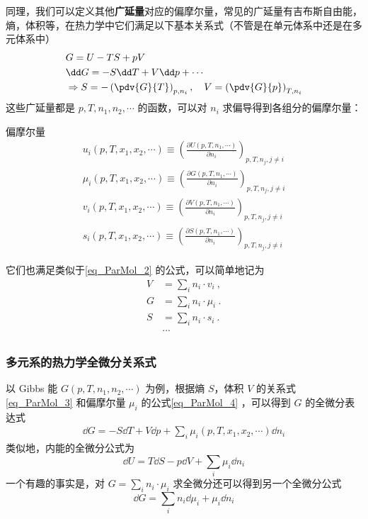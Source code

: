 同理，我们可以定义其他\textbf{广延量}对应的偏摩尔量，常见的广延量有吉布斯自由能，熵，体积等，在热力学中它们满足以下基本关系式（不管是在单元体系中还是在多元体系中）
\begin{equation}\label{eq_ParMol_3}
\begin{aligned}
&G=U-TS+pV\\
&\dd G=-S\dd T+V\dd p+\cdots\\
&\Rightarrow S=-\left(\pdv{G}{T}\right)_{p,n_i},\quad V=\left(\pdv{G}{p}\right)_{T,n_i}
\end{aligned}
\end{equation}
这些广延量都是 $p,T,n_1,n_2,\cdots$ 的函数，可以对 $n_i$ 求偏导得到各组分的偏摩尔量：
\begin{definition}{偏摩尔量}
\begin{equation}\label{eq_ParMol_4}
\begin{aligned}
u_i(p,T,x_1,x_2,\cdots )\equiv \left(\frac{\partial U(p,T,n_1,\cdots)}{\partial n_i}\right)_{p,T,n_j,j\neq i}\\
\mu_i(p,T,x_1,x_2,\cdots )\equiv \left(\frac{\partial G(p,T,n_1,\cdots)}{\partial n_i}\right)_{p,T,n_j,j\neq i}\\
v_i(p,T,x_1,x_2,\cdots )\equiv \left(\frac{\partial V(p,T,n_1,\cdots)}{\partial n_i}\right)_{p,T,n_j,j\neq i}\\
s_i(p,T,x_1,x_2,\cdots )\equiv \left(\frac{\partial S(p,T,n_1,\cdots)}{\partial n_i}\right)_{p,T,n_j,j\neq i}
\end{aligned}
\end{equation}
\end{definition}
它们也满足类似于\autoref{eq_ParMol_2} 的公式，可以简单地记为
\begin{equation}
\begin{aligned}
V &= \sum_i  n_i \cdot v_i ~,\\
G &= \sum_i  n_i \cdot \mu_i~.\\
S &= \sum_i  n_i \cdot s_i~.\\
&...\\
\end{aligned}
\end{equation}
\subsubsection{多元系的热力学全微分关系式}
以 Gibbs 能 $G(p,T,n_1,n_2,\cdots)$ 为例，根据熵 $S$，体积 $V$ 的关系式\autoref{eq_ParMol_3} 和偏摩尔量 $\mu_i$ 的公式\autoref{eq_ParMol_4} ，可以得到 $G$ 的全微分表达式
\begin{equation}
\begin{aligned}
\dd G=-S\dd T+V\dd p+\sum_i \mu_i(p,T,x_1,x_2,\cdots) \dd n_i
\end{aligned}
\end{equation}
类似地，内能的全微分公式为
\begin{equation}
\dd U=T\dd S-p\dd V+\sum_i \mu_i\dd n_i
\end{equation}
一个有趣的事实是，对 $G=\sum_i n_i\cdot \mu_i$ 求全微分还可以得到另一个全微分公式
\begin{equation}
\dd G=\sum_i n_i \dd \mu_i + \mu_i \dd n_i
\end{equation}




